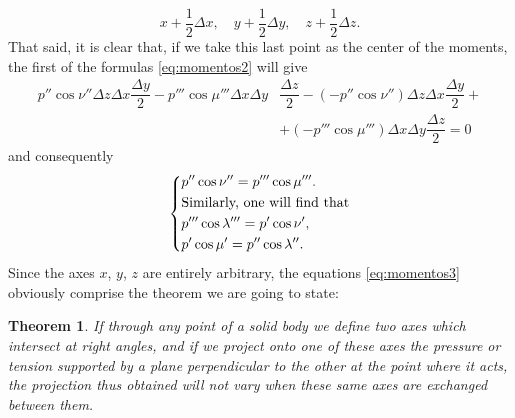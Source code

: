 \documentclass[leqno,openright,smallroyalvopaper,8pt,twoside,showtrims]{memoir}
\newtheorem{thm}{Theorem}
\begin{document}
\begin{equation*}
x+\dfrac{1}{2} \Delta x,\quad y+\dfrac{1}{2} \Delta y,\quad z+\dfrac{1}{2} \Delta z.
\end{equation*}
That said, it is clear that, if we take this last point as the center of the moments, the first of the formulas \eqref{eq:momentos2} will give
\begin{align*}
p''\cos\nu''\Delta z\Delta x\dfrac{\Delta y}{2}- p'''\cos\mu'''\Delta x\Delta y&\dfrac{\Delta z}{2}-(-p''\cos\nu'')\Delta z\Delta x\dfrac{\Delta y}{2}+\\
&+(-p'''\cos\mu''')\Delta x\Delta y\dfrac{\Delta z}{2}=0
\end{align*}
and consequently 
\begin{equation}\label{eq:momentos3}
   \begin{dcases}
   p''\cos\nu'' = p'''\cos\mu'''.\\
\text{Similarly, one will find that}\\
p'''\cos\lambda''' = p'\cos\nu',\\
p'\cos\mu'=p''\cos\lambda''.
    \end{dcases}
 \end{equation}
Since the axes $x$, $y$, $z$ are entirely arbitrary, the equations \eqref{eq:momentos3} obviously comprise the theorem we are going to state:
\begin{thm}
If through any point of a solid body we define two axes which intersect at right angles, and if we project onto one of these axes the pressure or tension supported by a plane perpendicular to the other at the point where it acts, the projection thus obtained will not vary when these same axes are exchanged between them.
\end{thm} 
\end{document}
